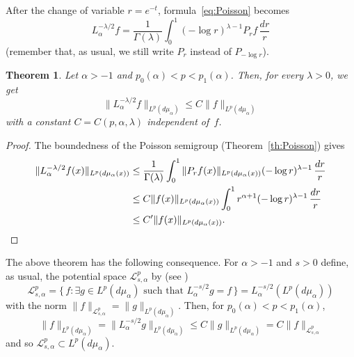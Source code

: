 \documentclass[11pt,a4paper]{amsart}
\newcommand{\mua}{d\mu_\alpha}
\newcommand{\calLpsa}{\mathcal{L}^p_{s,\alpha}} %
\newcommand{\lpnorm}[3]{\|{#1}\|_{L^{#2}({#3})}} %
\newcommand{\calnorm}[1]{\|{#1}\|_{\calLpsa}} %
\theoremstyle{plain}
\newtheorem{theor}{Theorem}
\theoremstyle{remark}
\begin{document}
After the change of variable $r=e^{-t}$, formula~\eqref{eq:Poisson} becomes
\begin{equation*}
  L_\alpha^{-\lambda/2}f
  = \frac{1}{\Gamma(\lambda)} 
  \int_0^1 ({-\log r})^{\lambda-1} P_r f \,\frac{dr}{r}
\end{equation*}
(remember that, as usual, we still write $P_r$ instead of $P_{-\log r}$).

\begin{theor}
\label{th:frac}
Let $\alpha > -1$ and $p_0(\alpha) < p < p_1(\alpha)$.
Then, for every $\lambda > 0$, we get 
\begin{equation*}
  \lpnorm{L_\alpha^{-\lambda/2} f}{p}{\mua} \le C \lpnorm{f}{p}{\mua}
\end{equation*}
with a constant $C=C(p,\alpha,\lambda)$ independent of~$f$.
\end{theor}

\begin{proof}
The boundedness of the Poisson semigroup (Theorem~\ref{th:Poisson}) gives
\begin{align*}
  \lpnorm{L_\alpha^{-\lambda/2} f(x)}{p}{\mua(x)}
  &\le \frac{1}{\Gamma(\lambda)}
    \int_0^1 \lpnorm{P_rf(x)}{p}{\mua(x)} ({-\log r})^{\lambda-1} \,\frac{dr}{r} \\
  &\le C \lpnorm{f(x)}{p}{\mua(x)}
    \int_0^1 r^{\alpha+1} ({-\log r})^{\lambda-1} \,\frac{dr}{r} \\
  &\le C' \lpnorm{f(x)}{p}{\mua(x)}.
  \qedhere
\end{align*}
\end{proof}

The above theorem has the following consequence. For $\alpha > -1$ and $s > 0$ define, as usual, the potential space $\calLpsa$ by (see \cite{Stein-2})
\[
  \calLpsa = \{\, f:  \exists g \in L^p(\mua)
    \text{ such that }  L_\alpha^{-s/2}g = f \,\}
  = L_\alpha^{-s/2}(L^p(\mua))
\]
with the norm $\calnorm{f} = \lpnorm{g}{p}{\mua}$.
Then, for $p_0(\alpha) < p < p_1(\alpha)$,
\[
  \lpnorm{f}{p}{\mua} = \lpnorm{L_\alpha^{-s/2}g}{p}{\mua}
  \le C \lpnorm{g}{p}{\mua} = C\calnorm{f}
\]
and so $\calLpsa \subset L^p(\mua)$.
\end{document}
